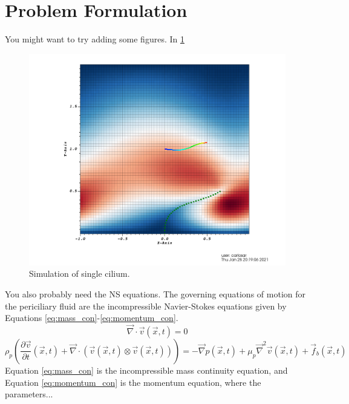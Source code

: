 \section{Problem Formulation}\label{sec:problem}

\blindtext

You might want to try adding some figures. In \ref{fig:an-image}
\begin{figure}\centering
\includegraphics[width=.75\linewidth]{img/cilia-pathline}%
\caption{\label{fig:an-image} Simulation of single cilium.}%
\end{figure}
\blindtext

You also probably need the NS equations. The governing equations of motion for the periciliary fluid are the incompressible Navier-Stokes equations given by Equations \ref{eq:mass_con}-\ref{eq:momentum_con}. 
    \begin{equation} \label{eq:mass_con}
        \vec{\nabla} \cdot \vec{v}(\vec{x},t) = 0
    \end{equation}
    \begin{equation} \label{eq:momentum_con}%
        \rho_p \left ( \frac{\partial \vec{v}}{\partial t} (\vec{x},t)
        + \vec{\nabla} \cdot (\vec{v}(\vec{x},t) \otimes \vec{v}(\vec{x},t)) \right) 
        = -\vec{\nabla} p (\vec{x},t)
        + \mu_{p}\vec{\nabla}^2 \vec{v} (\vec{x},t)
        + \vec{f}_b(\vec{x},t)
    \end{equation}
Equation \ref{eq:mass_con} is the incompressible mass continuity equation, and Equation \ref{eq:momentum_con} is the momentum equation, where the parameters...

